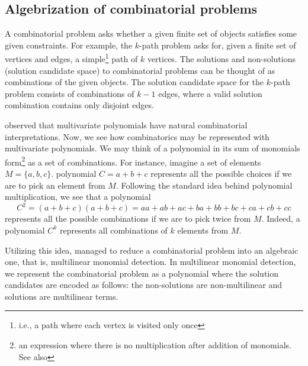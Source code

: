 \subsection{Algebrization of combinatorial problems}
\label{sect:algebrization}

A combinatorial problem asks whether a given 
finite set of objects satisfies some given constraints. 
For example, the $k$-path problem asks for, given a finite set of vertices and edges, 
a simple\footnote{i.e., a path where each vertex is visited only once} path of $k$ vertices. 
The solutions and non-solutions (solution candidate space) 
to combinatorial problems can be thought of as 
combinations of the given objects. 
The solution candidate space for the $k$-path problem 
consists of combinations of $k-1$ edges, where 
a valid solution combination contains only disjoint edges.
%


\textcite{Valiant92} observed that 
multivariate polynomials have natural combinatorial interpretations. 
Now, we see how combinatorics may be represented with multivariate polynomials. 
We may think of a polynomial in its sum of monomials 
form\footnote{an expression where there is no multiplication 
after addition of monomials. See also } 
as a set of combinations. For instance, imagine a set of elements $M = \{a, b, c\}$. 
 polynomial $C = a+b+c$ represents all the possible choices 
if we are to pick an element from $M$. Following the standard idea behind polynomial 
multiplication, we see that a polynomial 
\[
  C^2 = (a+b+c)(a+b+c) = aa + ab + ac + ba + bb + bc + ca + cb + cc
\]
represents 
all the possible combinations if we are to pick twice from $M$. 
Indeed, a polynomial $C^k$ represents all combinations of $k$ elements from $M$.

Utilizing this idea, \textcite{Koutis05} 
managed to reduce a combinatorial problem 
into an algebraic one, that is, multilinear monomial detection. 
In multilinear monomial detection, we represent the combinatorial problem 
as a polynomial where the solution candidates are encoded as follows: 
the non-solutions are non-multilinear and solutions are multilinear terms. 

